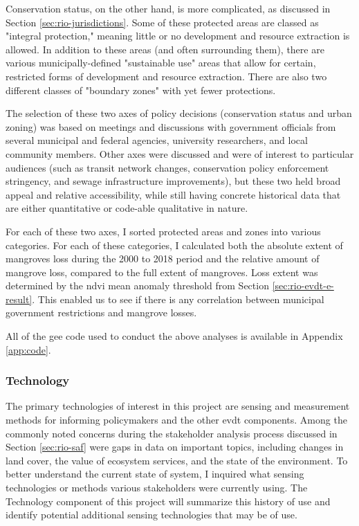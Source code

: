 Conservation status, on the other hand, is more complicated, as discussed in Section \ref{sec:rio-jurisdictions}. Some of these protected areas are classed as "integral protection," meaning little or no development and resource extraction is allowed. In addition to these areas (and often surrounding them), there are various municipally-defined "sustainable use" areas that allow for certain, restricted forms of development and resource extraction. There are also two different classes of "boundary zones" with yet fewer protections.

The selection of these two axes of policy decisions (conservation status and urban zoning) was based on meetings and discussions with government officials from several municipal and federal agencies, university researchers, and local community members. Other axes were discussed and were of interest to particular audiences (such as transit network changes, conservation policy enforcement stringency, and sewage infrastructure improvements), but these two held broad appeal and relative accessibility, while still having concrete historical data that are either quantitative or code-able qualitative in nature. 

For each of these two axes, I sorted protected areas and zones into various categories. For each of these categories, I calculated both the absolute extent of mangroves loss during the 2000 to 2018 period and the relative amount of mangrove loss, compared to the full extent of mangroves. Loss extent was determined by the \ac{ndvi} mean anomaly threshold from Section \ref{sec:rio-evdt-e-result}. This enabled us to see if there is any correlation between municipal government restrictions and mangrove losses.

All of the \ac{gee} code used to conduct the above analyses is available in Appendix \ref{app:code}.

\subsubsection{Technology}

The primary technologies of interest in this project are sensing and measurement methods for informing policymakers and the other \ac{evdt} components. Among the commonly noted concerns during the stakeholder analysis process discussed in Section \ref{sec:rio-saf} were gaps in data on important topics, including changes in land cover, the value of ecosystem services, and the state of the environment. To better understand the current state of system, I inquired what sensing technologies or methods various stakeholders were currently using. The Technology component of this project will summarize this history of use and identify potential additional sensing technologies that may be of use. 

